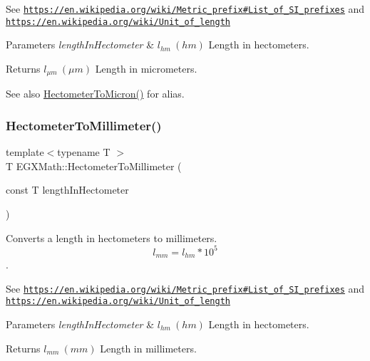 See \href{https://en.wikipedia.org/wiki/Metric_prefix#List_of_SI_prefixes}{\tt https\+://en.\+wikipedia.\+org/wiki/\+Metric\+\_\+prefix\#\+List\+\_\+of\+\_\+\+S\+I\+\_\+prefixes} and \href{https://en.wikipedia.org/wiki/Unit_of_length}{\tt https\+://en.\+wikipedia.\+org/wiki/\+Unit\+\_\+of\+\_\+length} 
\begin{DoxyParams}{Parameters}
{\em length\+In\+Hectometer} & $ l_{hm}\ (hm)$ Length in hectometers. \\
\hline
\end{DoxyParams}
\begin{DoxyReturn}{Returns}
$ l_{\mu m}\ (\mu m)$ Length in micrometers. 
\end{DoxyReturn}
\begin{DoxySeeAlso}{See also}
\mbox{\hyperlink{group___e_g_x_math-_conversions-_length_conversions-_hectometer-_non-_s_i_ga997feaaeb91fc61c1d87c5d77fb7a665}{Hectometer\+To\+Micron()}} for alias. 
\end{DoxySeeAlso}
\mbox{\label{group___e_g_x_math-_conversions-_length_conversions-_hectometer-_s_i_gaa4255093ded6f7cb739f3c519881c294}} 
\subsubsection{\texorpdfstring{Hectometer\+To\+Millimeter()}{HectometerToMillimeter()}}
{\footnotesize\ttfamily template$<$typename T $>$ \\
T E\+G\+X\+Math\+::\+Hectometer\+To\+Millimeter (\begin{DoxyParamCaption}\item[{const T}]{length\+In\+Hectometer }\end{DoxyParamCaption})}



Converts a length in hectometers to millimeters. \[ l_{mm}=l_{hm} * 10^{5} \]. 

See \href{https://en.wikipedia.org/wiki/Metric_prefix#List_of_SI_prefixes}{\tt https\+://en.\+wikipedia.\+org/wiki/\+Metric\+\_\+prefix\#\+List\+\_\+of\+\_\+\+S\+I\+\_\+prefixes} and \href{https://en.wikipedia.org/wiki/Unit_of_length}{\tt https\+://en.\+wikipedia.\+org/wiki/\+Unit\+\_\+of\+\_\+length} 
\begin{DoxyParams}{Parameters}
{\em length\+In\+Hectometer} & $ l_{hm}\ (hm)$ Length in hectometers. \\
\hline
\end{DoxyParams}
\begin{DoxyReturn}{Returns}
$ l_{mm}\ (mm)$ Length in millimeters. 
\end{DoxyReturn}
\mbox{\label{group___e_g_x_math-_conversions-_length_conversions-_hectometer-_s_i_gac9e19002288731e06d492cc5f8ee0a0e}} 
